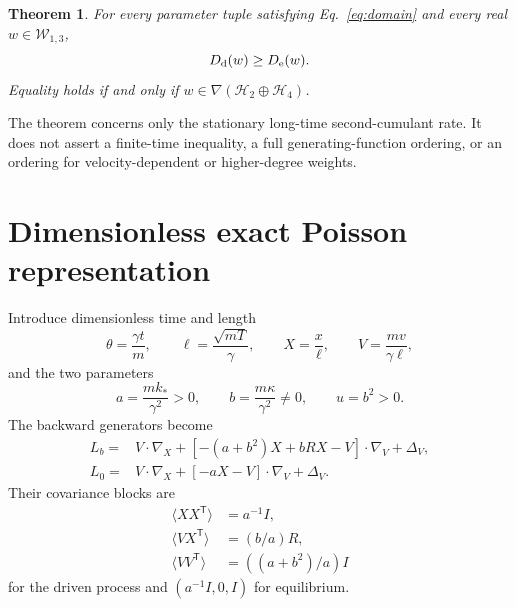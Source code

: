 \documentclass[aps,pre,reprint,amsmath,amssymb,superscriptaddress,nofootinbib]{revtex4-2}
\newcommand{\grad}{\nabla}
\newcommand{\cH}{\mathcal{H}}
\newcommand{\cW}{\mathcal{W}}
\newtheorem{theorem}{Theorem}
\begin{document}
\begin{theorem}
\label{thm:main}
For every parameter tuple satisfying Eq.~\eqref{eq:domain} and every real
$w\in\cW_{1,3}$,
\begin{equation}
 D_{\rm d}(w)\ge D_{\rm e}(w).
\label{eq:main-inequality}
\end{equation}
Equality holds if and only if
$w\in\grad(\cH_2\oplus\cH_4)$.
\end{theorem}

The theorem concerns only the stationary long-time second-cumulant rate.  It
does not assert a finite-time inequality, a full generating-function ordering,
or an ordering for velocity-dependent or higher-degree weights.

\section{Dimensionless exact Poisson representation}
\label{sec:poisson}

Introduce dimensionless time and length
\begin{equation}
 \theta=\frac{\gamma t}{m},\qquad
 \ell=\frac{\sqrt{mT}}{\gamma},\qquad
 X=\frac{x}{\ell},\qquad V=\frac{mv}{\gamma\ell},
\end{equation}
and the two parameters
\begin{equation}
 a=\frac{mk_*}{\gamma^2}>0,\qquad
 b=\frac{m\kappa}{\gamma^2}\ne0,\qquad u=b^2>0.
\label{eq:dimensionless-parameters}
\end{equation}
The backward generators become
\begin{subequations}
\label{eq:generators}
\begin{align}
 L_b={}&V\mathbin{\cdot}\grad_X+
 [-(a+b^2)X+bRX-V]\mathbin{\cdot}\grad_V+\Delta_V,\\
 L_0={}&V\mathbin{\cdot}\grad_X+[-aX-V]\mathbin{\cdot}\grad_V+\Delta_V.
\end{align}
\end{subequations}
Their covariance blocks are
\begin{equation}
 \begin{aligned}
 \langle XX^{\mathsf T}\rangle&=a^{-1}I,\\
 \langle VX^{\mathsf T}\rangle&=(b/a)R,\\
 \langle VV^{\mathsf T}\rangle&=((a+b^2)/a)I
 \end{aligned}
\label{eq:cov-blocks}
\end{equation}
for the driven process and $(a^{-1}I,0,I)$ for equilibrium.
\end{document}
